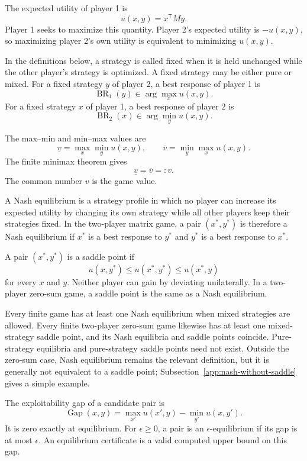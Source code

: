 The expected utility of player 1 is
\[
    u(x,y)=x^{\mathsf T}My.
\]
Player 1 seeks to maximize this quantity. Player 2's expected utility is $-u(x,y)$, so maximizing player 2's own utility is equivalent to minimizing $u(x,y)$.

In the definitions below, a strategy is called fixed when it is held unchanged while the other player's strategy is optimized. A fixed strategy may be either pure or mixed. For a fixed strategy $y$ of player 2, a best response of player 1 is
\[
    \operatorname{BR}_1(y)
    \in\arg\max_x u(x,y).
\]
For a fixed strategy $x$ of player 1, a best response of player 2 is
\[
    \operatorname{BR}_2(x)
    \in\arg\min_y u(x,y).
\]

The max--min and min--max values are
\[
    \underline v=\max_x\min_y u(x,y),
    \qquad
    \overline v=\min_y\max_x u(x,y).
\]
The finite minimax theorem gives
\[
    \underline v=\overline v=:v.
\]
The common number $v$ is the game value.

A Nash equilibrium is a strategy profile in which no player can increase its expected utility by changing its own strategy while all other players keep their strategies fixed. In the two-player matrix game, a pair $(x^\ast,y^\ast)$ is therefore a Nash equilibrium if $x^\ast$ is a best response to $y^\ast$ and $y^\ast$ is a best response to $x^\ast$.

A pair $(x^\ast,y^\ast)$ is a saddle point if
\[
    u(x,y^\ast)
    \leq
    u(x^\ast,y^\ast)
    \leq
    u(x^\ast,y)
\]
for every $x$ and $y$. Neither player can gain by deviating unilaterally. In a two-player zero-sum game, a saddle point is the same as a Nash equilibrium.

Every finite game has at least one Nash equilibrium when mixed strategies are allowed. Every finite two-player zero-sum game likewise has at least one mixed-strategy saddle point, and its Nash equilibria and saddle points coincide. Pure-strategy equilibria and pure-strategy saddle points need not exist. Outside the zero-sum case, Nash equilibrium remains the relevant definition, but it is generally not equivalent to a saddle point; Subsection~\ref{app:nash-without-saddle} gives a simple example.

The exploitability gap of a candidate pair is
\[
    \operatorname{Gap}(x,y)
    =
    \max_{x'}u(x',y)
    -
    \min_{y'}u(x,y').
\]
It is zero exactly at equilibrium. For $\epsilon\geq0$, a pair is an $\epsilon$-equilibrium if its gap is at most $\epsilon$. An equilibrium certificate is a valid computed upper bound on this gap.

